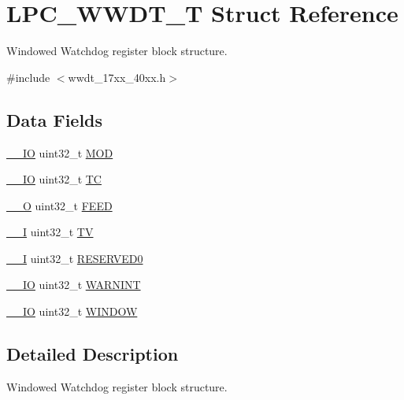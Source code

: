 \hypertarget{structLPC__WWDT__T}{\section{L\-P\-C\-\_\-\-W\-W\-D\-T\-\_\-\-T Struct Reference}
\label{structLPC__WWDT__T}
}


Windowed Watchdog register block structure.  




{\ttfamily \#include $<$wwdt\-\_\-17xx\-\_\-40xx.\-h$>$}

\subsection*{Data Fields}
\begin{DoxyCompactItemize}
\item 
\hyperlink{core__cm3_8h_aec43007d9998a0a0e01faede4133d6be}{\-\_\-\-\_\-\-I\-O} uint32\-\_\-t \hyperlink{structLPC__WWDT__T_a92ea6cd2032ed81f7c5f626b48c4c772}{M\-O\-D}
\item 
\hyperlink{core__cm3_8h_aec43007d9998a0a0e01faede4133d6be}{\-\_\-\-\_\-\-I\-O} uint32\-\_\-t \hyperlink{structLPC__WWDT__T_a8390ac91aea3330b363ad2fd5dc97f98}{T\-C}
\item 
\hyperlink{core__cm3_8h_a7e25d9380f9ef903923964322e71f2f6}{\-\_\-\-\_\-\-O} uint32\-\_\-t \hyperlink{structLPC__WWDT__T_a80b357a30f90ba82fd46ff1faa8fe4b8}{F\-E\-E\-D}
\item 
\hyperlink{core__cm3_8h_af63697ed9952cc71e1225efe205f6cd3}{\-\_\-\-\_\-\-I} uint32\-\_\-t \hyperlink{structLPC__WWDT__T_a8257032e074282d5242e1d2a07537db1}{T\-V}
\item 
\hyperlink{core__cm3_8h_af63697ed9952cc71e1225efe205f6cd3}{\-\_\-\-\_\-\-I} uint32\-\_\-t \hyperlink{structLPC__WWDT__T_af47cdcbd1ae7b068bf6b66566a140aa6}{R\-E\-S\-E\-R\-V\-E\-D0}
\item 
\hyperlink{core__cm3_8h_aec43007d9998a0a0e01faede4133d6be}{\-\_\-\-\_\-\-I\-O} uint32\-\_\-t \hyperlink{structLPC__WWDT__T_a6efaed3716fc4661ef3a7a52bcc9028a}{W\-A\-R\-N\-I\-N\-T}
\item 
\hyperlink{core__cm3_8h_aec43007d9998a0a0e01faede4133d6be}{\-\_\-\-\_\-\-I\-O} uint32\-\_\-t \hyperlink{structLPC__WWDT__T_abcc1eca1d9cc366b693a5333fb75d1e0}{W\-I\-N\-D\-O\-W}
\end{DoxyCompactItemize}


\subsection{Detailed Description}
Windowed Watchdog register block structure. 

